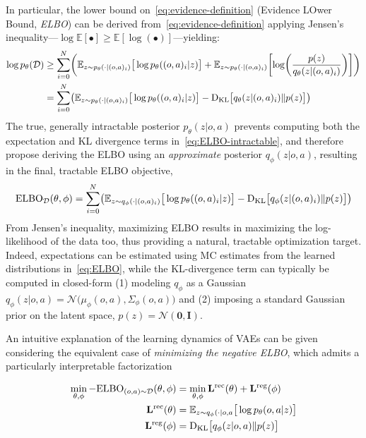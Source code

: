 In particular, the lower bound on~\ref{eq:evidence-definition} (Evidence LOwer Bound, \emph{ELBO}) can be derived from~\ref{eq:evidence-definition} applying Jensen's inequality---\(\log \mathbb{E}[\bullet] \geq \mathbb{E} [\log (\bullet)] \)---yielding:
\begin{align}
    \log p_\theta(\mathcal D) &\geq \sum_{i=0}^{N} \left(
            \mathbb{E}_{z \sim p_\theta(\cdot \vert (o,a)_i)} \big[ \log p_\theta((o,a)_i \vert z) \big]
            + \mathbb{E}_{z \sim p_\theta(\cdot \vert (o,a)_i)} \left[ \log \left( \frac{p(z)}{q_\theta(z \vert (o,a)_i)} \right) \right]
        \right) \\
        &= \sum_{i=0}^{N} \left(
            \mathbb{E}_{z \sim p_\theta(\cdot \vert (o,a)_i)} \big[ \log p_\theta((o,a)_i \vert z) \big]
        - \DKL \big[ q_\theta(z \vert (o,a)_i) \Vert p(z) \big]
        \right) \label{eq:ELBO-intractable}
\end{align}
The true, generally intractable posterior \( p_\theta (z \vert o,a) \) prevents computing both the expectation and KL divergence terms in~\ref{eq:ELBO-intractable}, and therefore~\citet{kingmaAutoEncodingVariationalBayes2022} propose deriving the ELBO using an \emph{approximate} posterior \( q_\phi(z \vert o,a) \), resulting in the final, tractable ELBO objective,
\begin{align}
\text{ELBO}_{\mathcal D}(\theta, \phi) = \sum_{i=0}^{N} \left(
            \mathbb{E}_{z \sim q_\phi(\cdot \vert (o,a)_i)} \big[ \log p_\theta((o,a)_i \vert z) \big]
        - \DKL \big[ q_\phi(z \vert (o,a)_i) \Vert p(z) \big]
        \right)
        \label{eq:ELBO}
\end{align}
From Jensen's inequality, maximizing ELBO results in maximizing the log-likelihood of the data too, thus providing a natural, tractable optimization target.
Indeed, expectations can be estimated using MC estimates from the learned distributions in~\ref{eq:ELBO}, while the KL-divergence term can typically be computed in closed-form (1) modeling  \(q_\phi \) as a Gaussian \(q_\phi(z \vert o,a) = \mathcal N\big(\mu_\phi(o,a), \Sigma_\phi(o,a) \big) \) and (2) imposing a standard Gaussian prior on the latent space, \( p(z) = \mathcal N(\mathbf{0}, \mathbf{I}) \).

An intuitive explanation of the learning dynamics of VAEs can be given considering the equivalent case of \emph{minimizing the negative ELBO}, which admits a particularly interpretable factorization

\begin{align}
\min_{\theta, \phi} - \text{ELBO}_{\mathcal (o,a) \sim \mathcal D}(\theta, \phi) &= \min_{\theta, \phi}\mathbf{L^{\text{rec}}}(\theta) + \mathbf{L^{\text{reg}}}(\phi) \label{eq:VAE-min-neg-ELBO}\\
\mathbf{L^{\text{rec}}}(\theta) &= \mathbb{E}_{z \sim q_\phi(\cdot \vert o,a} \big[ \log p_\theta(o,a \vert z) \big] \label{eq:VAE-Lrec} \\
\mathbf{L^{\text{reg}}}(\phi) &= \text{D}_{\text{KL}} \big[ q_\phi(z \vert o,a) \Vert p(z) \big] \label{eq:VAE-Lreg}
\end{align}

